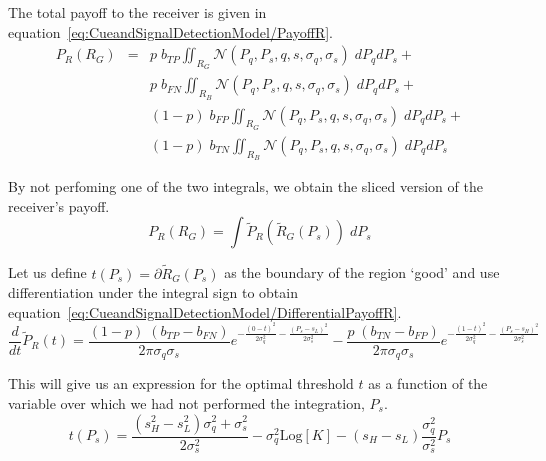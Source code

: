 \documentclass[a4paper,12pt]{article}
\numberwithin{equation}{section}
\begin{document}
The total payoff to the receiver is given in equation~\ref{eq:CueandSignalDetectionModel/PayoffR}.
\begin{equation}
\label{eq:CueandSignalDetectionModel/PayoffR}
\begin{array}{rcl}
P_{R}(R_{G}) &=& p \; b_{TP} \displaystyle \iint_{R_{G}} \mathcal{N}(P_{q}, P_{s}, q, s, \sigma_{q}, \sigma_{s}) \; dP_{q}dP_{s} +\\
&&p \; b_{FN} \displaystyle \iint_{R_{B}} \mathcal{N}(P_{q}, P_{s}, q, s, \sigma_{q}, \sigma_{s}) \; dP_{q}dP_{s} +\\
&&(1-p) \; b_{FP} \displaystyle \iint_{R_{G}} \mathcal{N}(P_{q}, P_{s}, q, s, \sigma_{q}, \sigma_{s}) \; dP_{q}dP_{s} +\\
&&(1-p) \; b_{TN} \displaystyle \iint_{R_{B}} \mathcal{N}(P_{q}, P_{s}, q, s, \sigma_{q}, \sigma_{s}) \; dP_{q}dP_{s}
\end{array}
\end{equation}

By not perfoming one of the two integrals, we obtain the sliced version of the receiver's payoff.
\begin{equation}
\label{eq:CueandSignalDetectionModel/SlicedPayoffR}
P_{R}(R_{G}) = \displaystyle \int \tilde{P}_{R}(\tilde{R}_{G}(P_{s})) \; dP_{s}
\end{equation}

Let us define $t(P_{s})=\partial \tilde{R}_{G}(P_{s})$ as the boundary of the region `good' and use differentiation under the integral sign to obtain equation~\ref{eq:CueandSignalDetectionModel/DifferentialPayoffR}.
\begin{equation}
\label{eq:CueandSignalDetectionModel/DifferentialPayoffR}
\frac{d}{dt}\tilde{P}_{R}(t)= \frac{(1-p) \; (b_{TP}-b_{FN})}{2 \pi \sigma_{q} \sigma_{s}} e^{-\frac{(0-t)^2}{2 \sigma_{q}^2}-\frac{(P_{s}-s_{L})^2}{2 \sigma_{s}^2}} - \frac{p \; (b_{TN}-b_{FP})}{2 \pi \sigma_{q} \sigma_{s}} e^{-\frac{(1-t)^2}{2 \sigma_{q}^2}-\frac{(P_{s}-s_{H})^2}{2 \sigma_{s}^2}}
\end{equation}

This will give us an expression for the optimal threshold $t$ as a function of the variable over which we had not performed the integration, $P_{s}$.
\begin{equation}
\label{eq:CueandSignalDetectionModel/Threshold}
t(P_{s})=\frac{(s_{H}^2-s_{L}^2)\sigma_{q}^{2}+\sigma_{s}^{2}}{2 \sigma_{s}^{2}}-\sigma_{q}^{2}\text{Log}[K]-(s_{H}-s_{L})\frac{\sigma_{q}^{2}}{\sigma_{s}^{2}} P_{s}
\end{equation}
\end{document}
